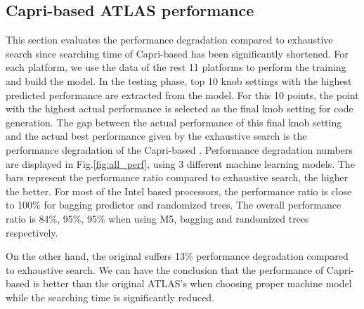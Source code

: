   \subsection{Capri-based ATLAS performance}
  \label{sec:capri_atlas_performance}
  This section evaluates the performance degradation compared to exhaustive
  search since searching time of Capri-based \atl has been significantly
  shortened. For each platform, we use the data of the rest 11 platforms to
  perform the training and build the model. In the testing phase, top 10
  knob settings with the highest predicted performance are extracted from the
  model. For this 10 points, the point with the highest actual performance is
  selected as the final knob setting for code generation. The gap between the
  actual performance of this final knob setting and the actual best performance
  given by the exhaustive search is the performance degradation of the
  Capri-based \atl. Performance degradation numbers are displayed in
  Fig.\ref{fig:all_perf}, using 3 different machine learning models. The bars
  represent the performance ratio compared to exhaustive search, the higher
  the better. For most of the Intel based processors, the performance ratio is
  close to 100\% for bagging predictor and randomized trees. The overall
  performance ratio is 84\%, 95\%, 95\% when using M5, bagging and randomized
  trees respectively.

  On the other hand, the original \atl suffers 13\% performance degradation
  compared to exhaustive search. We can have the conclusion that the
  performance of Capri-based \atl is better than the original ATLAS's when
  choosing proper machine model while the searching time is significantly
  reduced.

